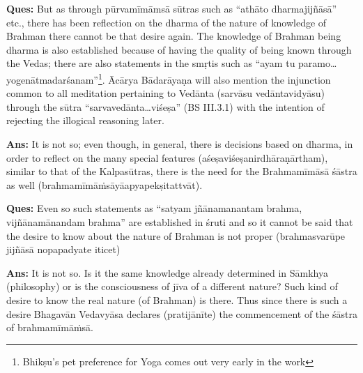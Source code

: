 
       

\textbf{Ques:} But as through pūrvamīmāmsā sūtras such as “athāto dharmajijñāsā” etc., there has been reflection on the dharma of the nature of knowledge of Brahman there cannot be that desire again. The know\-ledge of Brahman being dharma is also established because of having the quality of being known through the Vedas; there are also statements in the smṛtis such as “ayam tu paramo…yogenātmadarśanam”\footnote{Bhikṣu’s pet preference for Yoga comes out very early in the work}. Ācārya Bādarāyaṇa will also mention the injunction common to all meditation pertaining to Vedānta (sarvāsu vedāntavidyāsu) through the sūtra “sarvavedānta…viśeṣa” (BS III.3.1) with the intention of rejecting the illogical reasoning later.

\textbf{Ans:} It is not so; even though, in general, there is decisions based on dharma, in order to reflect on the many special features (aśeṣaviśeṣanirdhāraṇārtham), similar to that of the Kalpasūtras, there is the need for the Brahmamīmāsā śāstra as well (brahmamīmāṁsāyā\break apyapekṣitattvāt).

\textbf{Ques:} Even so such statements as “satyam jñānamanantam brahma, vijñānamānandam brahma” are established in śruti and so it cannot be said that the desire to know about the nature of Brahman is not proper (brahmasvarūpe jijñāsā nopapadyate iticet)

\textbf{Ans:} It is not so. Is it the same knowledge already determined in Sāmkhya (philosophy) or is the consciousness of jīva of a different nature? Such kind of desire to know the real nature (of Brahman) is there. Thus since there is such a desire Bhagavān Vedavyāsa declares (pratijānīte) the commencement of the śāstra of brahmamīmāṁsā.

